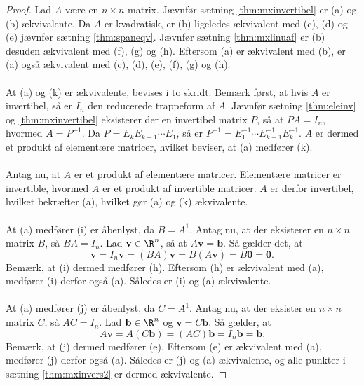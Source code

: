 \begin{proof}
Lad $A$ være en $n \times n$ matrix.
Jævnfør sætning \ref{thm:mxinvertibel} er (a) og (b) ækvivalente. 
Da $A$ er kvadratisk, er (b) ligeledes ækvivalent med (c), (d) og (e) jævnfør sætning \ref{thm:spaneqv}. 
Jævnfør sætning \ref{thm:mxlinuaf} er (b) desuden ækvivalent med (f), (g) og (h). 
Eftersom (a) er ækvivalent med (b), er (a) også ækvivalent med (c), (d), (e), (f), (g) og (h). 
\\\\
At (a) og (k) er ækvivalente, bevises i to skridt. 
Bemærk først, at hvis $A$ er invertibel, så er $I_n$ den reducerede trappeform af $A$. 
Jævnfør sætning \ref{thm:eleinv} og \ref{thm:mxinvertibel} eksisterer der en invertibel matrix $P$, så at $PA=I_n$, hvormed $A=P^{-1}$. 
Da $P=E_kE_{k-1} \cdots E_1$, så er $P^{-1}=E_1^{-1} \cdots E_{k-1}^{-1}E_k^{-1}$.
$A$ er dermed et produkt af elementære matricer, hvilket beviser, at (a) medfører (k). \\\\
Antag nu, at $A$ er et produkt af elementære matricer. 
Elementære matricer er invertible, hvormed $A$ er et produkt af invertible matricer. 
$A$ er derfor invertibel, hvilket bekræfter (a), hvilket gør (a) og (k) ækvivalente. 
\\\\
At (a) medfører (i) er åbenlyst, da $B=A^{1}$. 
Antag nu, at der eksisterer en $n \times n$ matrix $B$, så $BA=I_n$. Lad $\textbf{v} \in \R^n$, så at $A\textbf{v}=\textbf{b}$. Så gælder det, at 
$$
\textbf{v} = I_n\textbf{v} = (BA)\textbf{v} = B(A\textbf{v}) = B\textbf{0} = \textbf{0}.
$$
Bemærk, at (i) dermed medfører (h).
Eftersom (h) er ækvivalent med (a), medfører (i) derfor også (a).
Således er (i) og (a) ækvivalente. 
\\\\
At (a) medfører (j) er åbenlyst, da $C=A^{1}$.
Antag nu, at der eksister en $n \times n$ matrix $C$, så $AC=I_n$. 
Lad $\textbf{b} \in \R^n$ og $\textbf{v}=C\textbf{b}$. 
Så gælder, at 
$$
A\textbf{v} = A(C\textbf{b}) = (AC)\textbf{b} = I_n\textbf{b} = \textbf{b}.
$$
Bemærk, at (j) dermed medfører (e).
Eftersom (e) er ækvivalent med (a), medfører (j) derfor også (a).
Således er (j) og (a) ækvivalente, og alle punkter i sætning \ref{thm:mxinvers2} er dermed ækvivalente.
\end{proof}